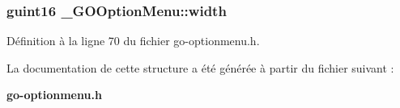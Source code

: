 \subsubsection[{width}]{\setlength{\rightskip}{0pt plus 5cm}guint16 {\bf \_\-GOOptionMenu::width}}\label{struct__GOOptionMenu_addb1689f2cd2040ee3c31f90a7efa854}


Définition à la ligne 70 du fichier go-\/optionmenu.h.



La documentation de cette structure a été générée à partir du fichier suivant :\begin{DoxyCompactItemize}
\item 
{\bf go-\/optionmenu.h}\end{DoxyCompactItemize}
